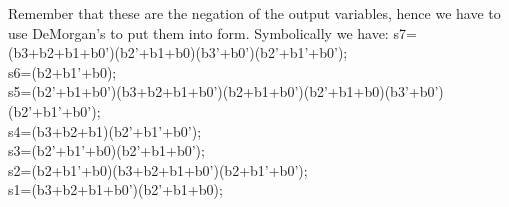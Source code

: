 \begin{enumerate}
\begin{enumerate}
\begin{onlysolution}
{%

                            Remember that these are the negation of the output variables, hence
                            we have to use DeMorgan's to put them into \POSmin form.
                            Symbolically we have:
s7=(b3+b2+b1+b0')(b2'+b1+b0)(b3'+b0')(b2'+b1'+b0'); \\
s6=(b2+b1'+b0); \\
s5=(b2'+b1+b0')(b3+b2+b1+b0')(b2+b1+b0')(b2'+b1+b0)(b3'+b0')(b2'+b1'+b0'); \\
s4=(b3+b2+b1)(b2'+b1'+b0'); \\
s3=(b2'+b1'+b0)(b2'+b1+b0'); \\
s2=(b2+b1'+b0)(b3+b2+b1+b0')(b2+b1'+b0'); \\
s1=(b3+b2+b1+b0')(b2'+b1+b0); \\
                        }
                    \end{onlysolution}
            \end{enumerate}


\end{enumerate}
